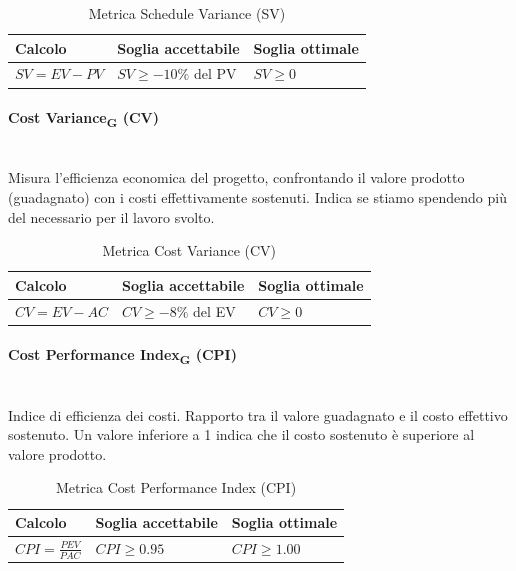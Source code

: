 \documentclass[11pt,a4paper]{article}
\begin{document}
\begin{table}[H]
    \centering
    \renewcommand{\arraystretch}{1.5} %
    \begin{tabular}{|M{0.4\textwidth}|M{0.25\textwidth}|M{0.25\textwidth}|}
        \hline
        \textbf{Calcolo} & \textbf{Soglia accettabile} & \textbf{Soglia ottimale} \\
        \hline
        $SV = EV - PV$ & $SV \ge -10\%$ del PV & $SV \ge 0$ \\
        \hline
    \end{tabular}
    \caption{Metrica Schedule Variance (SV)}
\end{table}

\paragraph{Cost Variance\textsubscript{G} (CV)} \hfill \\
Misura l'efficienza economica del progetto, confrontando il valore prodotto (guadagnato) con i costi effettivamente sostenuti. Indica se stiamo spendendo più del necessario per il lavoro svolto.

\begin{table}[H]
    \centering
    \renewcommand{\arraystretch}{1.5} %
    \begin{tabular}{|M{0.4\textwidth}|M{0.25\textwidth}|M{0.25\textwidth}|}
        \hline
        \textbf{Calcolo} & \textbf{Soglia accettabile} & \textbf{Soglia ottimale} \\
        \hline
        $CV = EV - AC$ & $CV \ge -8\%$ del EV & $CV \ge 0$ \\
        \hline
    \end{tabular}
    \caption{Metrica Cost Variance (CV)}
\end{table}

\paragraph{Cost Performance Index\textsubscript{G} (CPI)} \hfill \\
Indice di efficienza dei costi. Rapporto tra il valore guadagnato e il costo effettivo sostenuto. Un valore inferiore a 1 indica che il costo sostenuto è superiore al valore prodotto.

\begin{table}[H]
    \centering
    \renewcommand{\arraystretch}{1.5}
    \begin{tabular}{|M{0.4\textwidth}|M{0.25\textwidth}|M{0.25\textwidth}|}
        \hline
        \textbf{Calcolo} & \textbf{Soglia accettabile} & \textbf{Soglia ottimale} \\
        \hline
        $CPI = \frac{PEV}{PAC}$ & $CPI \ge 0.95$ & $CPI \ge 1.00$ \\
        \hline
    \end{tabular}
    \caption{Metrica Cost Performance Index (CPI)}
\end{table}
\end{document}
